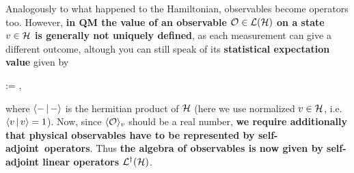Analogously to what happened to the Hamiltonian, observables become operators too. However, \textbf{in QM the value of an observable $\mathcal{O} \in \mathcal{L}(\mathcal{H})$ on a state $v \in \mathcal{H}$ is generally not uniquely defined}, as each measurement can give a different outcome, altough you can still speak of its \textbf{statistical expectation value} given by
\begin{eqalign}
	 := ,
\end{eqalign}
where $\langle {-} \,|\, {-} \rangle$ is the hermitian product of $\mathcal{H}$ (here we use normalized $v \in \mathcal{H}$, i.e. $\langle {v} \,|\, {v} \rangle = 1$). Now, since $\langle {\mathcal{O}} \rangle_{v}$ should be a real number, \textbf{we require additionally that physical observables have to be represented by self-adjoint\footnotemark\ operators}. Thus \textbf{the algebra of observables is now given by self-adjoint linear operators $\mathcal{L}^\dagger(\mathcal{H})$}.

